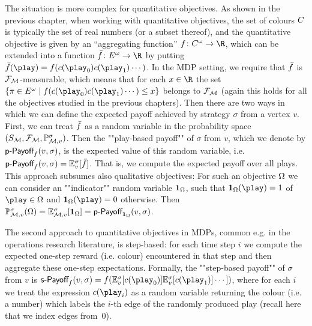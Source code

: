 The situation is more complex for quantitative objectives. As shown in the previous chapter, 
when working with quantitative objectives, the set of colours $C$ is typically the set of real numbers (or a subset thereof), and the quantitative objective is given by an ``aggregating function'' $\quantObj\colon \colours^\omega \rightarrow \R$, which can be extended into a function $\quantObjExt\colon \edges^\omega \rightarrow \R $ by putting $ \quantObjExt(\play) = \quantObj( \colouring(\play_0)\colouring(\play_1)\cdots) $.
In the MDP setting, we 
require that $\bar{f}$ is $\mathcal{F}_{\mathcal{M}}$-measurable, which 
means that for each $x\in \R$ the set $\{\pi\in \edges^\omega\mid 
\quantObj(\colouring(\play_0)\colouring(\play_1)\cdots) \leq x\}$ belongs to 
$\mathcal{F}_{\mathcal{M}}$ (again this holds for all the objectives studied 
in the previous chapters). Then there are two ways in which we can define the expected payoff achieved by strategy $ \sigma $ from a vertex $ v $.
First, we can treat 
$\bar{f}$ as a random variable 
in the probability space 
$(S_{\mathcal{M}},\mathcal{F}_{\mathcal{M}},\mathbb{P}^{\sigma}_{\mathcal{M},v})$. Then the ""play-based payoff"" of $\sigma$ from $ v $, which we denote by $ \textsf{p-Payoff}_f(v,\sigma) $, is the expected value of this random variable, i.e. $ \textsf{p-Payoff}_f(v,\sigma) = \mathbb{E}_{v}^\sigma [\bar{f}] $. That is, we compute the expected payoff over all plays. This approach subsumes also qualitative objectives: For such an objective $\Omega$ we can consider an ""indicator"" random 
variable $\mathbf{1}_{\Omega}$, such that $\indicator{\objective}(\play)=1$ 
of 
$\play\in\Omega$ and $\indicator{\objective}(\play)=0$ otherwise. Then 
$\mathbb{P}^{\sigma}_{\mathcal{M},v}(\Omega) = 
\mathbb{E}^{\sigma}_{\mathcal{M},v}[\mathbf{1}_{\Omega}] = \textsf{p-Payoff}_{\mathbf{1}_{\Omega}}(v,\sigma)$.




The second approach to quantitative objectives in MDPs, common e.g. in the operations research literature, is step-based: for each time step $i$ we compute the expected one-step reward (i.e. colour) encountered in that step and then  aggregate  these one-step expectations. Formally, the ""step-based payoff"" of $ \sigma $ from $ v $ is $ \stepPay_f(v,\sigma) = \quantObj(\expv_{v}^\sigma[\colouring(\play_0)] \expv_{v}^\sigma[\colouring(\play_1)]\cdots] ) $, where for each $ i $ we treat the expression $ \colouring(\play_i) $ as a random variable returning the colour (i.e. a number) which labels the $ i $-th edge of the randomly produced play (recall here that we index edges from~$ 0 $). 

